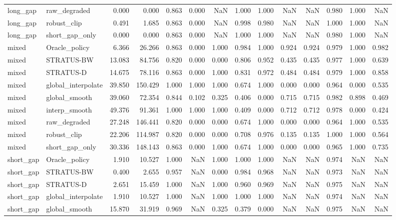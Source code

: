\begin{tabular}{llrrrrrrrrrrrr}
long_gap & raw_degraded & 0.000 & 0.000 & 0.863 & 0.000 & NaN & 1.000 & 1.000 & NaN & NaN & 0.980 & 1.000 & NaN \\
long_gap & robust_clip & 0.491 & 1.685 & 0.863 & 0.000 & NaN & 0.998 & 0.980 & NaN & NaN & 1.000 & 1.000 & NaN \\
long_gap & short_gap_only & 0.000 & 0.000 & 0.863 & 0.000 & NaN & 1.000 & 1.000 & NaN & NaN & 0.980 & 1.000 & NaN \\
mixed & Oracle_policy & 6.366 & 26.266 & 0.863 & 0.000 & 1.000 & 0.984 & 1.000 & 0.924 & 0.924 & 0.979 & 1.000 & 0.982 \\
mixed & STRATUS-BW & 13.083 & 84.756 & 0.820 & 0.000 & 0.000 & 0.806 & 0.952 & 0.435 & 0.435 & 0.977 & 1.000 & 0.639 \\
mixed & STRATUS-D & 14.675 & 78.116 & 0.863 & 0.000 & 1.000 & 0.831 & 0.972 & 0.484 & 0.484 & 0.979 & 1.000 & 0.858 \\
mixed & global_interpolate & 39.850 & 150.429 & 1.000 & 1.000 & 1.000 & 0.674 & 1.000 & 0.000 & 0.000 & 0.964 & 0.000 & 0.535 \\
mixed & global_smooth & 39.060 & 72.354 & 0.844 & 0.102 & 0.325 & 0.406 & 0.000 & 0.715 & 0.715 & 0.982 & 0.898 & 0.469 \\
mixed & interp_smooth & 49.376 & 91.361 & 1.000 & 1.000 & 1.000 & 0.409 & 0.000 & 0.712 & 0.712 & 0.978 & 0.000 & 0.424 \\
mixed & raw_degraded & 27.248 & 146.441 & 0.820 & 0.000 & 0.000 & 0.674 & 1.000 & 0.000 & 0.000 & 0.964 & 1.000 & 0.535 \\
mixed & robust_clip & 22.206 & 114.987 & 0.820 & 0.000 & 0.000 & 0.708 & 0.976 & 0.135 & 0.135 & 1.000 & 1.000 & 0.564 \\
mixed & short_gap_only & 30.336 & 148.143 & 0.863 & 0.000 & 1.000 & 0.674 & 1.000 & 0.000 & 0.000 & 0.965 & 1.000 & 0.735 \\
short_gap & Oracle_policy & 1.910 & 10.527 & 1.000 & NaN & 1.000 & 1.000 & 1.000 & NaN & NaN & 0.974 & NaN & NaN \\
short_gap & STRATUS-BW & 0.400 & 2.655 & 0.957 & NaN & 0.000 & 0.984 & 0.968 & NaN & NaN & 0.973 & NaN & NaN \\
short_gap & STRATUS-D & 2.651 & 15.459 & 1.000 & NaN & 1.000 & 0.960 & 0.969 & NaN & NaN & 0.975 & NaN & NaN \\
short_gap & global_interpolate & 1.910 & 10.527 & 1.000 & NaN & 1.000 & 1.000 & 1.000 & NaN & NaN & 0.974 & NaN & NaN \\
short_gap & global_smooth & 15.870 & 31.919 & 0.969 & NaN & 0.325 & 0.379 & 0.000 & NaN & NaN & 0.975 & NaN & NaN \\

\end{tabular}
